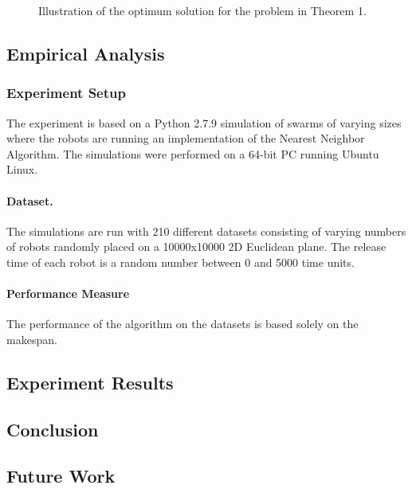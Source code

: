 \documentclass[twoside]{article}
\begin{document}
\begin{figure*}[t!]
{                 
                }
        \caption{Illustration of the optimum solution for the problem in Theorem 1.}
\end{figure*}


\begin{multicols}{2}
\subsection{Empirical Analysis}
\subsubsection{Experiment Setup}
The experiment is based on a Python 2.7.9 simulation of swarms of varying sizes where the robots are running an implementation of the Nearest Neighbor Algorithm. The simulations were performed on a 64-bit PC running Ubuntu Linux.
\paragraph{Dataset.} The simulations are run with 210 different datasets consisting of varying numbers of robots randomly placed on a 10000x10000 2D Euclidean plane. The release time of each robot is a random number between 0 and 5000 time units.
\paragraph{Performance Measure} The performance of the algorithm on the datasets is based solely on the makespan. 

\subsection{Experiment Results}
\subsection{Conclusion}
\subsection{Future Work}
\end{multicols}
\end{document}
